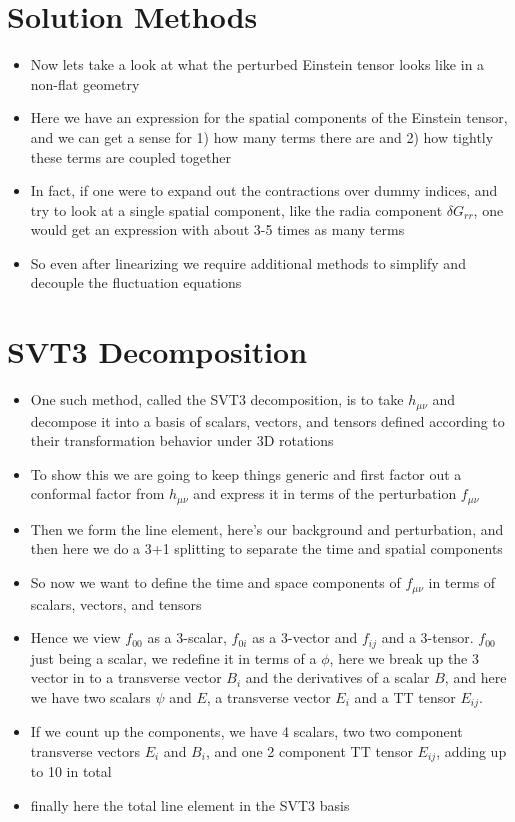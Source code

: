 \documentclass[10pt,letterpaper]{article}
\numberwithin{equation}{section}
\begin{document}
\section{Solution Methods}
\begin{itemize}
	\item Now lets take a look at what the perturbed Einstein tensor looks like in a non-flat geometry
	\item Here we have an expression for the spatial components of the Einstein tensor, and we can get a sense for 1) how many terms there are and 2) how tightly these terms are coupled together
	\item In fact, if one were to expand out the contractions over dummy indices, and try to look at a single spatial component, like the radia component $\delta G_{rr}$, one would get an expression with about 3-5 times as many terms
	\item So even after linearizing we require additional methods to simplify and decouple the fluctuation equations
\end{itemize}



\section{SVT3 Decomposition}
\begin{itemize}
	\item One such method, called the SVT3 decomposition, is to take $h_{\mu\nu}$ and decompose it into a basis of scalars, vectors, and tensors defined according to their transformation behavior under 3D rotations
	\item To show this we are going to keep things generic and first factor out a conformal factor from $h_{\mu\nu}$ and express it in terms of the perturbation $f_{\mu\nu}$
	\item Then we form the line element, here's our background and perturbation, and then here we do a 3+1 splitting to separate the time and spatial components
	\item So now we want to define the time and space components of $f_{\mu\nu}$ in terms of scalars, vectors, and tensors
	\item Hence we view $f_{00}$ as a 3-scalar, $f_{0i}$ as a 3-vector and $f_{ij}$ and a 3-tensor. $f_{00}$ just being a scalar, we redefine it in terms of a $\phi$, here we break up the 3 vector in to a transverse vector $B_i$ and the derivatives of a scalar $B$, and here we have two scalars $\psi$ and $E$, a transverse vector $E_i$ and a TT tensor $E_{ij}$. 
	\item If we count up the components, we have 4 scalars, two two component transverse vectors $E_i$ and $B_i$, and one 2 component TT tensor $E_{ij}$, adding up to 10 in total
	\item finally here the total line element in the SVT3 basis
\end{itemize}
\end{document}
